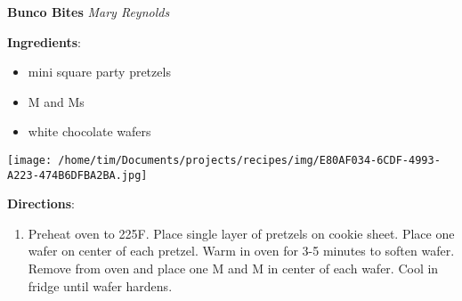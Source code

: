 \documentclass[11pt, twoside, openany]{book}
\begin{document}
\noindent\begin{minipage}[t]{\linewidth}%
{\Large\textbf{Bunco Bites}} \label{bunco-bites}\hfill\textit{Mary Reynolds}\\
\noindent\begin{minipage}[t]{0.78\linewidth}%
\textbf{Ingredients}:\vspace{-3mm}
\begin{multicols}{2}
\begin{itemize}\setlength\itemsep{-1mm}
\item mini square party pretzels
\item M and Ms
\item white chocolate wafers
\end{itemize}
\end{multicols}
\end{minipage}
\noindent\begin{minipage}[t]{0.18\linewidth}
\centering \strut\vspace*{-\baselineskip}\newline
\texttt{[image: /home/tim/Documents/projects/recipes/img/E80AF034-6CDF-4993-A223-474B6DFBA2BA.jpg]}\\
\end{minipage}\vspace{3mm}
\textbf{Directions}:
\vspace{-3mm}\begin{enumerate}\setlength\itemsep{-1mm}
\item Preheat oven to 225F. Place single layer of pretzels on cookie sheet. Place one wafer on center of each pretzel. Warm in oven for 3-5 minutes to soften wafer. Remove from oven and place one M and M in center of each wafer. Cool in fridge until wafer hardens.
\end{enumerate}
\end{minipage}\vspace{8mm}
\end{document}
